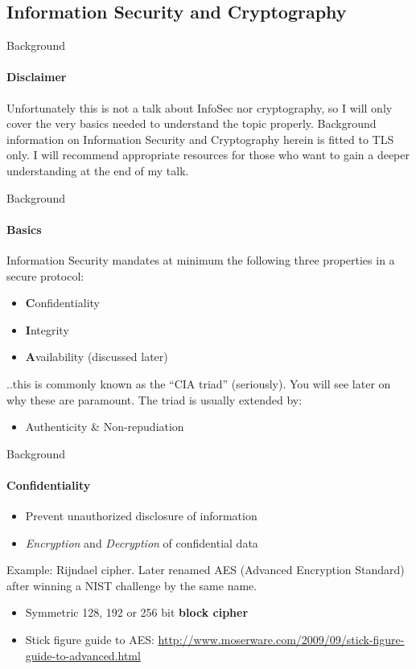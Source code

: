 \documentclass[hyperref={draft}]{beamer}
\begin{document}
\subsection{Information Security and Cryptography}

\begin{frame}{Background}
  \framesubtitle{Disclaimer}
  Unfortunately this is not a talk about InfoSec nor cryptography, so I will only cover the very basics needed to understand the topic properly. Background information on Information Security and Cryptography herein is fitted to TLS only.
  \newline
  \newline
  I will recommend appropriate resources for those who want to gain a deeper understanding at the end of my talk.
\end{frame}

\begin{frame}{Background}
  \framesubtitle{Basics}
  Information Security mandates at minimum the following three properties in a secure protocol:
  \begin{itemize}
    \item \textbf{C}onfidentiality
    \item \textbf{I}ntegrity
    \item \textbf{A}vailability (discussed later)
  \end{itemize}
  ..this is commonly known as the ``CIA triad'' (seriously). You will see later on why these are paramount. The triad is usually extended by:
  \begin{itemize}
    \item Authenticity \& Non-repudiation
  \end{itemize}
\end{frame}

\begin{frame}{Background}
  \framesubtitle{Confidentiality}
  \begin{itemize}
    \item Prevent unauthorized disclosure of information
    \item \emph{Encryption} and \emph{Decryption} of confidential data
  \end{itemize}
  Example: Rijndael cipher. Later renamed AES (Advanced Encryption Standard) after winning a NIST challenge by the same name.
  \begin{itemize}
    \item Symmetric 128, 192 or 256 bit \textbf{block cipher} 
    \item Stick figure guide to AES: \url{http://www.moserware.com/2009/09/stick-figure-guide-to-advanced.html}
  \end{itemize}
\end{frame}
\end{document}
